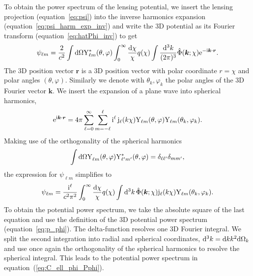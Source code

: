 \documentclass[fleqn,usenatbib]{mnras} %
\renewcommand{\vec}{\bm}
\begin{document}
\begin{appendix}
To obtain the power spectrum of the lensing potential, 
we insert the lensing projection (equation~\ref{eq:psi}) into the
inverse harmonics expansion (equation~\ref{eq:psi_harm_exp_inv}) and write the 3D potential
as its Fourier transform (equation~\ref{eq:hatPhi_inv}) to get
%
\begin{equation}
  \psi_{\ell m} = \frac 2 {c^2} \int {\rm d} \Omega {\rm Y}^\ast_{\ell m}(\theta, \varphi)
    \int_0^\infty \frac{{\rm d}\chi}{\chi} q(\chi) \int \frac{{\rm d}^3 k}{(2\pi)^3} \hat \Phi(\vec k; \chi) {\rm e}^{-{\rm i} \vec k \cdot \vec r}.
\end{equation}
%
The 3D position vector $\vec r$ is a 3D position vector with polar coordinate
$r = \chi$ and polar angles $(\theta, \varphi)$. Similarly we denote with
$\theta_k, \varphi_k$ the polar angles of the 3D Fourier vector $\vec k$. We
insert the expansion of a plane wave into spherical harmonics,
%
%
\begin{equation}
  {\rm e}^{{\rm i} \vec k \cdot \vec r} = 4 \pi \sum_{\ell=0}^{\infty} \sum_{m=-\ell}^{\ell}
    {\rm i}^\ell \, {\rm j}_\ell(k \chi)
    {\rm Y}_{\ell m}(\theta, \varphi) {\rm Y}_{\ell m}(\theta_k, \varphi_k) .
  \label{eq:wave_exp}
\end{equation}
%
Making use of the orthogonality of the spherical harmonics
%
%
\begin{equation}
  \int {\rm d} \Omega {\rm Y}^{}_{\ell m}(\theta, \varphi) {\rm Y}^\ast_{\ell^\prime m^\prime}(\theta, \varphi) = \delta_{\ell \ell^\prime} \delta_{m m^\prime},
  \label{eq:Yellm_ortho}
\end{equation}
%
the expression for $\psi_{\ell m}$ simplifies to
%
\begin{equation}
  \psi_{\ell m} = \frac {{\rm i}^\ell}{c^2 \pi^2} \int_0^\infty \frac{{\rm d}\chi}{\chi} q(\chi) \int {\rm d}^3 k \,
    \hat \Phi(\vec k; \chi) {\rm j}_\ell(k \chi) {\rm Y}_{\ell m}(\theta_k, \varphi_k).
  \label{eq:psi_ellm}
\end{equation}
%
To obtain the potential power spectrum, we take the absolute square of the
last equation and use the definition of the 3D potential power spectrum
(equation~\ref{eq:p_phi}). The delta-function resolves one 3D Fourier integral.
We split the second integration into radial and spherical coordinates, ${\rm
d}^3 k = {\rm d} k k^2 {\rm d} \Omega_k$ and use once again the orthogonality
of the spherical harmonics to resolve the spherical integral. This leads to the
potential power spectrum in equation~(\ref{eq:C_ell_phi_Pphi}).





\end{appendix}
\end{document}
